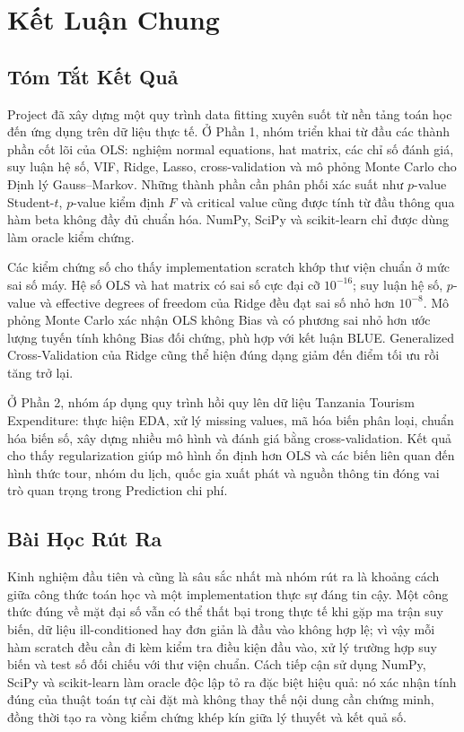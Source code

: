 \section{Kết Luận Chung}

\subsection{Tóm Tắt Kết Quả}

Project đã xây dựng một quy trình data fitting xuyên suốt từ nền tảng toán học
đến ứng dụng trên dữ liệu thực tế. Ở Phần 1, nhóm triển khai từ đầu các thành
phần cốt lõi của OLS: nghiệm normal equations, hat matrix, các chỉ số đánh giá,
suy luận hệ số, VIF, Ridge, Lasso, cross-validation và mô phỏng Monte Carlo cho
Định lý Gauss--Markov. Những thành phần cần phân phối xác suất như
$p$-value Student-$t$, $p$-value kiểm định $F$ và critical value cũng được tính
từ đầu thông qua hàm beta không đầy đủ chuẩn hóa. NumPy, SciPy và scikit-learn
chỉ được dùng làm oracle kiểm chứng.

Các kiểm chứng số cho thấy implementation scratch khớp thư viện chuẩn ở mức
sai số máy. Hệ số OLS và hat matrix có sai số cực đại cỡ $10^{-16}$; suy luận
hệ số, $p$-value và effective degrees of freedom của Ridge đều đạt sai số nhỏ
hơn $10^{-8}$. Mô phỏng Monte Carlo xác nhận OLS không Bias và có phương sai
nhỏ hơn ước lượng tuyến tính không Bias đối chứng, phù hợp với kết luận BLUE.
Generalized Cross-Validation của Ridge cũng thể hiện đúng dạng giảm đến điểm
tối ưu rồi tăng trở lại.

Ở Phần 2, nhóm áp dụng quy trình hồi quy lên dữ liệu Tanzania Tourism
Expenditure: thực hiện EDA, xử lý missing values, mã hóa biến phân loại, chuẩn
hóa biến số, xây dựng nhiều mô hình và đánh giá bằng cross-validation. Kết quả
cho thấy regularization giúp mô hình ổn định hơn OLS và các biến liên quan đến
hình thức tour, nhóm du lịch, quốc gia xuất phát và nguồn thông tin đóng vai trò
quan trọng trong Prediction chi phí.

\subsection{Bài Học Rút Ra}

Kinh nghiệm đầu tiên và cũng là sâu sắc nhất mà nhóm rút ra là khoảng cách giữa công thức toán học và một implementation thực sự đáng tin cậy. Một công thức đúng về mặt đại số vẫn có thể thất bại trong thực tế khi gặp ma trận suy biến, dữ liệu ill-conditioned hay đơn giản là đầu vào không hợp lệ; vì vậy mỗi hàm scratch đều cần đi kèm kiểm tra điều kiện đầu vào, xử lý trường hợp suy biến và test số đối chiếu với thư viện chuẩn. Cách tiếp cận sử dụng NumPy, SciPy và scikit-learn làm oracle độc lập tỏ ra đặc biệt hiệu quả: nó xác nhận tính đúng của thuật toán tự cài đặt mà không thay thế nội dung cần chứng minh, đồng thời tạo ra vòng kiểm chứng khép kín giữa lý thuyết và kết quả số.

